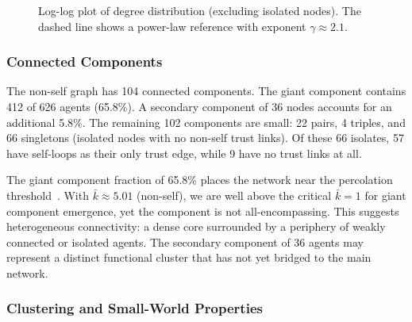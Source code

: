 \documentclass[11pt,twocolumn]{article}
\begin{document}
\begin{figure}[t]
\centering
{}
\caption{Log-log plot of degree distribution (excluding isolated nodes). The dashed line shows a power-law reference with exponent $\gamma \approx 2.1$.}
\label{fig:degree-loglog}
\end{figure}

\subsubsection{Connected Components}

The non-self graph has 104 connected components. The giant component contains 412 of 626 agents (65.8\%). A secondary component of 36 nodes accounts for an additional 5.8\%. The remaining 102 components are small: 22 pairs, 4 triples, and 66 singletons (isolated nodes with no non-self trust links). Of these 66 isolates, 57 have self-loops as their only trust edge, while 9 have no trust links at all.

The giant component fraction of 65.8\% places the network near the percolation threshold~\citep{erdos1960evolution}. With $\bar{k} \approx 5.01$ (non-self), we are well above the critical $\bar{k} = 1$ for giant component emergence, yet the component is not all-encompassing. This suggests heterogeneous connectivity: a dense core surrounded by a periphery of weakly connected or isolated agents. The secondary component of 36 agents may represent a distinct functional cluster that has not yet bridged to the main network.

\subsubsection{Clustering and Small-World Properties}
\end{document}
